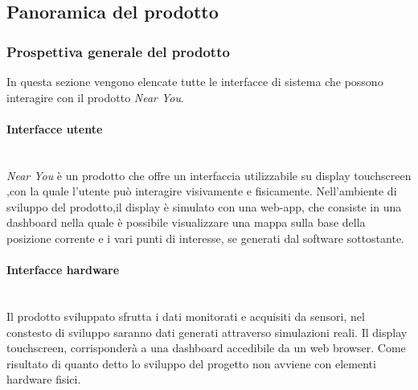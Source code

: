 \documentclass[11pt]{article}
\begin{document}
\begin{justify}
\subsection{Panoramica del prodotto}
\subsubsection{Prospettiva generale del prodotto} 
In questa sezione vengono elencate tutte le interfacce di sistema che possono interagire con il prodotto \textit{Near You}.

\paragraph{Interfacce utente}\mbox{}\\
\textit{Near You} è un prodotto che offre un interfaccia utilizzabile su display touchscreen ,con la quale l'utente può interagire visivamente e fisicamente. Nell'ambiente di sviluppo del prodotto,il display è simulato con una web-app, che consiste in una dashboard nella quale è possibile visualizzare una mappa sulla base della posizione corrente e i vari punti di interesse, se generati dal software sottostante.
\paragraph{Interfacce hardware}\mbox{}\\
Il prodotto sviluppato sfrutta i dati monitorati e acquisiti da sensori, nel constesto di sviluppo saranno dati generati attraverso simulazioni reali. Il display touchscreen, corrisponderà a una dashboard accedibile da un web browser. Come risultato di quanto detto lo sviluppo del progetto non avviene con elementi hardware fisici.


\end{justify}
\end{document}
